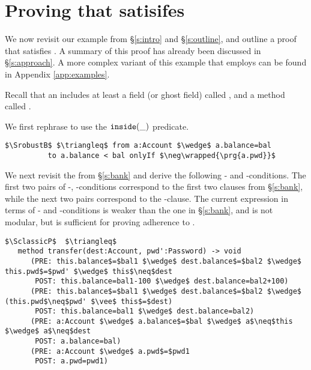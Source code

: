 \section{Proving that \ModC satisifes \SrobustB}
\label{s:examples}
We now revisit our example from  \S  \ref{s:intro} and \S \ref{s:outline},
and outline a proof that \ModC satisfies \SrobustB. 
A {summary} of this proof has already been discussed in \S \ref{s:approach}.
 A more complex variant of this example that employs   can be found in Appendix \ref{app:examples}.
 
Recall that an  includes %
 at least a  field  (or ghost field)  called , and a method called . 

%
 We first rephrase 
\SrobustB to use the $\texttt{inside}( \_ )$ predicate.
\begin{lstlisting}[language=Chainmail, mathescape=true, frame=lines]
$\SrobustB$ $\triangleq$ from a:Account $\wedge$ a.balance=bal 
          to a.balance < bal onlyIf $\neg\wrapped{\prg{a.pwd}}$
\end{lstlisting}

We next revisit the   \funcSpec from \S \ref{s:bank} and derive the following 
- and -conditions. The first two pairs of -, -conditions correspond to the first two 
clauses from \S \ref{s:bank}, while the next two pairs correspond to the -clause. The current expression in terms
of - and -conditions is weaker than the one in \S \ref{s:bank}, and is not modular, but is
sufficient for proving adherence to  \SrobustB.

\begin{lstlisting}[mathescape=true, frame=lines, language=Chainmail]
$\SclassicP$  $\triangleq$
   method transfer(dest:Account, pwd':Password) -> void  
      (PRE: this.balance$=$bal1 $\wedge$ dest.balance$=$bal2 $\wedge$ this.pwd$=$pwd' $\wedge$ this$\neq$dest
       POST: this.balance=bal1-100 $\wedge$ dest.balance=bal2+100)
      (PRE: this.balance$=$bal1 $\wedge$ dest.balance$=$bal2 $\wedge$ (this.pwd$\neq$pwd' $\vee$ this$=$dest)
       POST: this.balance=bal1 $\wedge$ dest.balance=bal2)
      (PRE: a:Account $\wedge$ a.balance$=$bal $\wedge$ a$\neq$this $\wedge$ a$\neq$dest 
       POST: a.balance=bal)          
      (PRE: a:Account $\wedge$ a.pwd$=$pwd1  
       POST: a.pwd=pwd1)         
\end{lstlisting}


